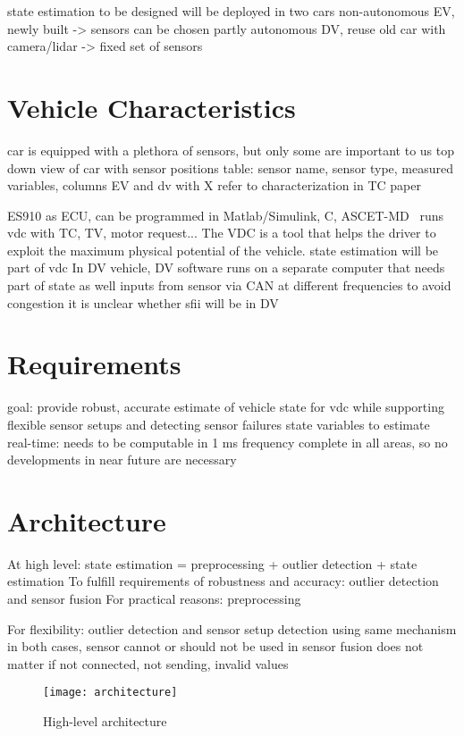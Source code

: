 state estimation to be designed will be deployed in two cars
non-autonomous EV, newly built -> sensors can be chosen
partly autonomous DV, reuse old car with camera/lidar -> fixed set of sensors

\section{Vehicle Characteristics}
car is equipped with a plethora of sensors, but only some are important to us
top down view of car with sensor positions
table: sensor name, sensor type, measured variables, columns EV and dv with X
refer to characterization in TC paper

ES910 as ECU, can be programmed in Matlab/Simulink, C, ASCET-MD~\cite[p.~17]{ETASGmbHStuttgart.2018}
runs \gls{vdc} with TC, TV, motor request...
The VDC is a tool that helps the driver to exploit the maximum physical potential of the vehicle.
state estimation will be part of \gls{vdc}
In DV vehicle, DV software runs on a separate computer that needs part of state as well
inputs from sensor via CAN at different frequencies to avoid congestion
it is unclear whether sfii will be in DV

\section{Requirements}
goal: provide robust, accurate estimate of vehicle state for \gls{vdc} while supporting flexible sensor setups and detecting sensor failures
state variables to estimate
real-time: needs to be computable in 1 ms frequency
complete in all areas, so no developments in near future are necessary

\section{Architecture}
At high level: state estimation = preprocessing + outlier detection + state estimation
To fulfill requirements of robustness and accuracy: outlier detection and sensor fusion
For practical reasons: preprocessing

For flexibility: outlier detection and sensor setup detection using same mechanism
in both cases, sensor cannot or should not be used in sensor fusion
does not matter if not connected, not sending, invalid values

\begin{figure}[h]
	\centering
	\texttt{[image: architecture]}%
	\caption{High-level architecture}
	\label{fig:architecture}
\end{figure}

